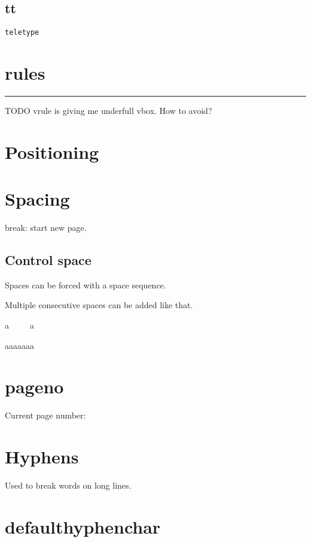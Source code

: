   \subsection{tt}

    {\tt teletype}

\section{rules}

  \hrule

  TODO vrule is giving me underfull vbox. How to avoid?

  \vrule height 1mm

\section{Positioning}

\section{Spacing}

  \bs break: start new page.

  \break

  \subsection{Control space}

    Spaces can be forced with a \bs space sequence.

    Multiple consecutive spaces can be added like that.

    a\ \ \ \ \ a

    aaaaaaa

\section{pageno}

  Current page number: \number\pageno

\section{Hyphens}

  Used to break words on long lines.

  \section{defaulthyphenchar}

